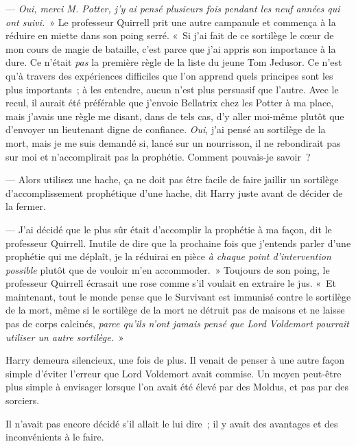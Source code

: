 --- \emph{Oui, merci M. Potter, j'y ai pensé plusieurs fois pendant les neuf années qui ont suivi.}~» Le professeur Quirrell prit une autre campanule et commença à la réduire en miette dans son poing serré. «~Si j'ai fait de ce sortilège le cœur de mon cours de magie de bataille, c'est parce que j'ai appris son importance à la dure. Ce n'était \emph{pas} la première règle de la liste du jeune Tom Jedusor. Ce n'est qu'à travers des expériences difficiles que l'on apprend quels principes sont les plus importants~; à les entendre, aucun n'est plus persuasif que l'autre. Avec le recul, il aurait été préférable que j'envoie Bellatrix chez les Potter à ma place, mais j'avais une règle me disant, dans de tels cas, d'y aller moi-même plutôt que d'envoyer un lieutenant digne de confiance. \emph{Oui}, j'ai pensé au sortilège de la mort, mais je me suis demandé si, lancé sur un nourrisson, il ne rebondirait pas sur moi et n'accomplirait pas la prophétie. Comment pouvais-je savoir~?

--- Alors utilisez une hache, ça ne doit pas être facile de faire jaillir un sortilège d'accomplissement prophétique d'une hache, dit Harry juste avant de décider de la fermer.

--- J'ai décidé que le plus sûr était d'accomplir la prophétie à ma façon, dit le professeur Quirrell. Inutile de dire que la prochaine fois que j'entends parler d'une prophétie qui me déplaît, je la réduirai en pièce \emph{à chaque point d'intervention possible} plutôt que de vouloir m'en accommoder.~» Toujours de son poing, le professeur Quirrell écrasait une rose comme s'il voulait en extraire le jus. «~Et maintenant, tout le monde pense que le Survivant est immunisé contre le sortilège de la mort, même si le sortilège de la mort ne détruit pas de maisons et ne laisse pas de corps calcinés, \emph{parce qu'ils n'ont jamais pensé que Lord Voldemort pourrait utiliser un autre sortilège}.~»

Harry demeura silencieux, une fois de plus. Il venait de penser à une autre façon simple d'éviter l'erreur que Lord Voldemort avait commise. Un moyen peut-être plus simple à envisager lorsque l'on avait été élevé par des Moldus, et pas par des sorciers.

Il n'avait pas encore décidé s'il allait le lui dire~; il y avait des avantages et des inconvénients à le faire.

